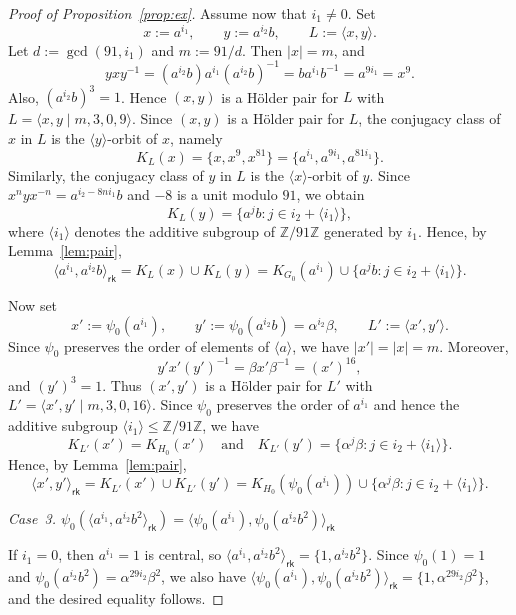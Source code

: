 \documentclass[a4paper,12pt]{article}
\theoremstyle{definition}
\theoremstyle{remark}
\begin{document}
\begin{proof}[Proof of Proposition~\ref{prop:ex}]
  Assume now that $i_1\neq 0$. Set
  $$ x:=a^{i_1},\qquad y:=a^{i_2}b,\qquad L:=\langle x,y\rangle. $$
  Let $d:=\gcd(91,i_1)$ and $m:=91/d$. Then $|x|=m$, and
  $$ yxy^{-1} = (a^{i_2}b)a^{i_1}(a^{i_2}b)^{-1} = ba^{i_1}b^{-1} = a^{9i_1} = x^9. $$
  Also, $(a^{i_2}b)^3=1$. Hence $(x,y)$ is a Hölder pair for $L$ with $L=\langle x,y\mid m,3,0,9\rangle$. Since $(x,y)$ is a Hölder pair for $L$, the conjugacy class of $x$ in $L$ is the
  $\langle y\rangle$-orbit of $x$, namely
  $$ K_L(x)=\{x,x^9,x^{81}\}=\{a^{i_1},a^{9i_1},a^{81i_1}\}. $$
  Similarly, the conjugacy class of $y$ in $L$ is the $\langle x\rangle$-orbit of $y$. Since $x^n y x^{-n}=a^{i_2-8n i_1}b$ and $-8$ is a unit modulo $91$, we obtain
  $$ K_L(y)=\{a^j b : j\in i_2+\langle i_1\rangle\}, $$
  where $\langle i_1\rangle$ denotes the additive subgroup of $\mathbb{Z}/91\mathbb{Z}$ generated by $i_1$. Hence, by Lemma~\ref{lem:pair},
  $$ \langle a^{i_1},a^{i_2}b\rangle_{\mathsf{rk}} = K_L(x)\cup K_L(y) = K_{G_0}(a^{i_1})\cup\{a^j b : j\in i_2+\langle i_1\rangle\}. $$
  
  Now set
  $$ x':=\psi_0(a^{i_1}),\qquad y':=\psi_0(a^{i_2}b)=\alpha^{i_2}\beta,\qquad L':=\langle x',y'\rangle. $$
  Since $\psi_0$ preserves the order of elements of $\langle a\rangle$, we have $|x'|=|x|=m$. Moreover,
  $$ y'x'(y')^{-1}=\beta x'\beta^{-1}=(x')^{16}, $$
  and $(y')^3=1$. Thus $(x',y')$ is a Hölder pair for $L'$ with $L'=\langle x',y'\mid m,3,0,16\rangle$. Since $\psi_0$ preserves the order of $a^{i_1}$ and hence the additive subgroup $\langle i_1\rangle\leq \mathbb{Z}/91\mathbb{Z}$, we have
  $$ K_{L'}(x')=K_{H_0}(x')\quad \text{and}\quad K_{L'}(y')=\{\alpha^j\beta : j\in i_2+\langle i_1\rangle\}. $$
  Hence, by Lemma~\ref{lem:pair},
  $$ \langle x',y'\rangle_{\mathsf{rk}} = K_{L'}(x')\cup K_{L'}(y') = K_{H_0}(\psi_0(a^{i_1}))\cup \{\alpha^j\beta : j\in i_2+\langle i_1\rangle\}. $$
  
  
  
  \medskip
  \noindent
  \emph{Case~3.\; $\psi_0(\langle a^{i_1},a^{i_2}b^2\rangle_{\mathsf{rk}})=\langle \psi_0(a^{i_1}),\psi_0(a^{i_2}b^2)\rangle_{\mathsf{rk}}$}
  
  \medskip
  If $i_1=0$, then $a^{i_1}=1$ is central, so $\langle a^{i_1},a^{i_2}b^2\rangle_{\mathsf{rk}}=\{1,a^{i_2}b^2\}$. Since $\psi_0(1)=1$ and $\psi_0(a^{i_2}b^2)=\alpha^{29i_2}\beta^2$, we also have $\langle \psi_0(a^{i_1}),\psi_0(a^{i_2}b^2)\rangle_{\mathsf{rk}}=\{1,\alpha^{29i_2}\beta^2\}$, and the desired equality follows.
  

\end{proof}
\end{document}
